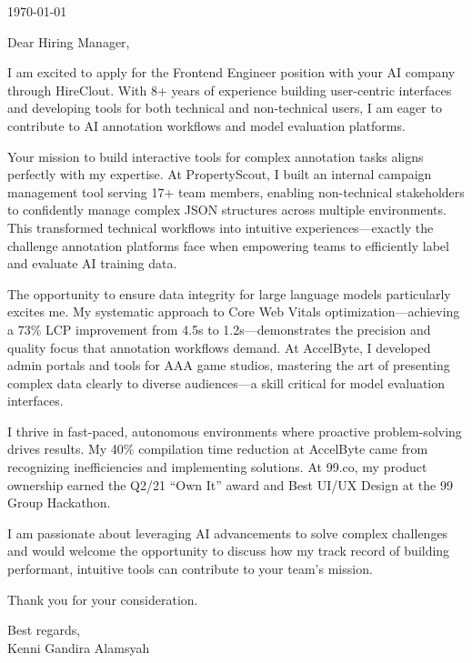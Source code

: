 \documentclass[a4paper, 11pt]{article}
\newcommand{\link}[2]{{\color[HTML]{096dd9}\href[pdfnewwindow=true]{#1}{#2}}}
\begin{document}

\vspace{20pt}

\today

\vspace{20pt}

Dear Hiring Manager,

I am excited to apply for the Frontend Engineer position with your AI company through HireClout. With 8+ years of experience building user-centric interfaces and developing tools for both technical and non-technical users, I am eager to contribute to AI annotation workflows and model evaluation platforms.

Your mission to build interactive tools for complex annotation tasks aligns perfectly with my expertise. At PropertyScout, I built an internal campaign management tool serving 17+ team members, enabling non-technical stakeholders to confidently manage complex JSON structures across multiple environments. This transformed technical workflows into intuitive experiences---exactly the challenge annotation platforms face when empowering teams to efficiently label and evaluate AI training data.

The opportunity to ensure data integrity for large language models particularly excites me. My systematic approach to Core Web Vitals optimization---achieving a 73\% LCP improvement from 4.5s to 1.2s---demonstrates the precision and quality focus that annotation workflows demand. At AccelByte, I developed admin portals and tools for AAA game studios, mastering the art of presenting complex data clearly to diverse audiences---a skill critical for model evaluation interfaces.

I thrive in fast-paced, autonomous environments where proactive problem-solving drives results. My 40\% compilation time reduction at AccelByte came from recognizing inefficiencies and implementing solutions. At 99.co, my product ownership earned the Q2/21 ``Own It'' award and Best UI/UX Design at the 99 Group Hackathon.

I am passionate about leveraging AI advancements to solve complex challenges and would welcome the opportunity to discuss how my track record of building performant, intuitive tools can contribute to your team's mission.

Thank you for your consideration.

\vspace{10pt}

Best regards, \\
Kenni Gandira Alamsyah
\end{document}
